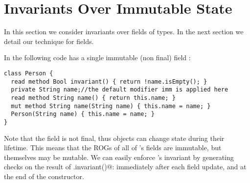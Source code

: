 \section{Invariants Over Immutable State}
\label{s:immutable}
In this section we consider invariants over fields of \Q@imm@ types.
In the next section we detail our technique for \Q@capsule@ fields.

In the following code \Q@Person@ has a single immutable (non final) field \Q@name@:
\begin{lstlisting}
class Person {
  read method Bool invariant() { return !name.isEmpty(); }
  private String name;//the default modifier imm is applied here
  read method String name() { return this.name; }
  mut method String name(String name) { this.name = name; }
  Person(String name) { this.name = name; }
}
\end{lstlisting}
Note that the \Q@name@ field is not final, thus \Q@Person@ objects can change state during their lifetime. This means that the ROGs of all of \Q@Person@'s fields are immutable, but \Q@Person@s themselves may be mutable.
We can easily enforce \Q@Person@'s invariant by generating checks on the result of \Q@this.invariant()@: immediately after each field update, and at the end of the constructor.%
